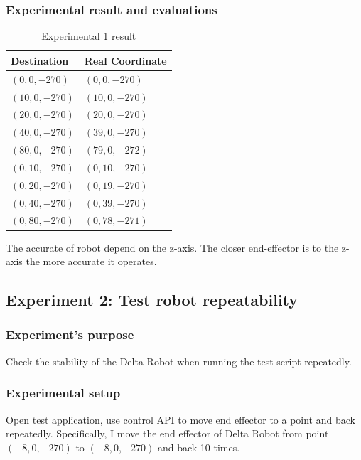 \subsubsection{Experimental result and evaluations}
\begin{table}[H]
	\centering
	\caption{Experimental 1 result}	
	\label{tab:experiment_1}
	\begin{tabularx}{0.4\textwidth}{l|l}
		\toprule
		\textbf{Destination}	& \textbf{Real Coordinate} \\
		\midrule 
		$(0,0,-270)$			& $(0,0,-270)$ \\
		\midrule 
		$(10,0,-270)$			& $(10,0,-270)$ \\
		\midrule
		$(20,0,-270)$			& $(20,0,-270)$ \\ 
		\midrule
		$(40,0,-270)$			& $(39,0,-270)$ \\ 
		\midrule
		$(80,0,-270)$			& $(79,0,-272)$ \\ 
		\midrule
		$(0,10,-270)$			& $(0,10,-270)$ \\ 
		\midrule
		$(0,20,-270)$			& $(0,19,-270)$ \\ 
		\midrule
		$(0,40,-270)$			& $(0,39,-270)$ \\ 
		\midrule
		$(0,80,-270)$			& $(0,78,-271)$ \\ 
		\bottomrule
	\end{tabularx}
\end{table}

The accurate of robot depend on the z-axis. The closer end-effector is to the z-axis the more accurate it operates.

\subsection{Experiment 2: Test robot repeatability}
\subsubsection{Experiment's purpose}
Check the stability of the Delta Robot when running the test script repeatedly.
\subsubsection{Experimental setup}
Open test application, use control API to move end effector to a point and back repeatedly. Specifically, I move the end effector of Delta Robot from point $(-8, 0, -270)$ to $(-8, 0, -270)$ and back 10 times.

